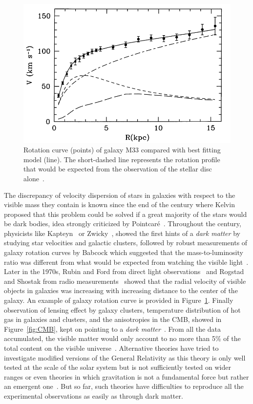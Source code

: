 	\begin{figure}[H]
		\centering
		\includegraphics[width=0.7\plotwidth]{fig/chapt2/M33-rotation-curve.png}
		\caption{\label{fig:galaxy} Rotation curve (points) of galaxy M33 compared with best fitting model (line). The short-dashed line represents the rotation profile that would be expected from the observation of the stellar disc alone~\cite{CORBELLI2000}.}
	\end{figure}
	
	The discrepancy of velocity dispersion of stars in galaxies with respect to the visible mass they contain is known since the end of the  century where Kelvin proposed that this problem could be solved if a great majority of the stars would be dark bodies, idea strongly criticized by Pointcaré~\cite{POINTCARE1906}. Throughout the  century, physicists like Kapteyn~\cite{KAPTEYN1922} or Zwicky~\cite{ZWICKY1933,ZWICKY1937}, showed the first hints of a \textit{dark matter} by studying star velocities and galactic clusters, followed by robust measurements of galaxy rotation curves by Babcock which suggested that the mass-to-luminosity ratio was different from what would be expected from watching the visible light~\cite{BABCOCK1939}. Later in the 1970s, Rubin and Ford from direct light observations~\cite{RUNBIN1970} and Rogstad and Shostak from radio measurements~\cite{ROGSTAD1972} showed that the radial velocity of visible objects in galaxies was increasing with increasing distance to the center of the galaxy. An example of galaxy rotation curve is provided in Figure~\ref{fig:galaxy}. Finally observation of lensing effect by galaxy clusters, temperature distribution of hot gas in galaxies and clusters, and the anisotropies in the \acf{CMB}, showed in Figure~\ref{fig:CMB}, kept on pointing to a \textit{dark matter}~\cite{PLANK2016}. From all the data accumulated, the visible matter would only account to no more than 5\% of the total content on the visible universe~\cite{JAROSIK2011}. Alternative theories have tried to investigate modified versions of the General Relativity as this theory is only well tested at the scale of the solar system but is not sufficiently tested on wider ranges or even theories in which gravitation is not a fundamental force but rather an emergent one~\cite{VERLINDE2016,MAEDER2017}. But so far, such theories have difficulties to reproduce all the experimental observations as easily as through dark matter.
	
